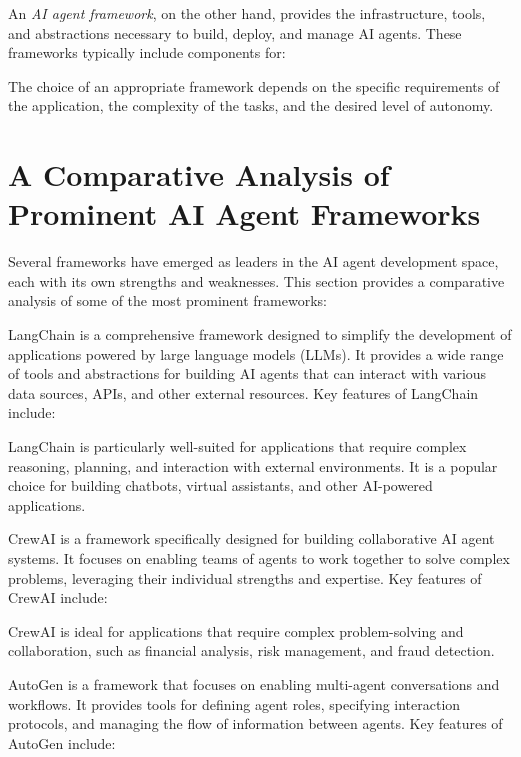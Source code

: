 \documentclass[a4paper,headinclude=on,footinclude=on,12pt,oneside]{scrbook}
\begin{document}
An \textit{AI agent framework}, on the other hand, provides the infrastructure, tools, and abstractions necessary to build, deploy, and manage AI agents. These frameworks typically include components for:


The choice of an appropriate framework depends on the specific requirements of the application, the complexity of the tasks, and the desired level of autonomy.

\section*{A Comparative Analysis of Prominent AI Agent Frameworks}

Several frameworks have emerged as leaders in the AI agent development space, each with its own strengths and weaknesses. This section provides a comparative analysis of some of the most prominent frameworks:


LangChain is a comprehensive framework designed to simplify the development of applications powered by large language models (LLMs). It provides a wide range of tools and abstractions for building AI agents that can interact with various data sources, APIs, and other external resources. Key features of LangChain include:


LangChain is particularly well-suited for applications that require complex reasoning, planning, and interaction with external environments. It is a popular choice for building chatbots, virtual assistants, and other AI-powered applications.


CrewAI is a framework specifically designed for building collaborative AI agent systems. It focuses on enabling teams of agents to work together to solve complex problems, leveraging their individual strengths and expertise. Key features of CrewAI include:

CrewAI is ideal for applications that require complex problem-solving and collaboration, such as financial analysis, risk management, and fraud detection.


AutoGen is a framework that focuses on enabling multi-agent conversations and workflows. It provides tools for defining agent roles, specifying interaction protocols, and managing the flow of information between agents. Key features of AutoGen include:
\end{document}
